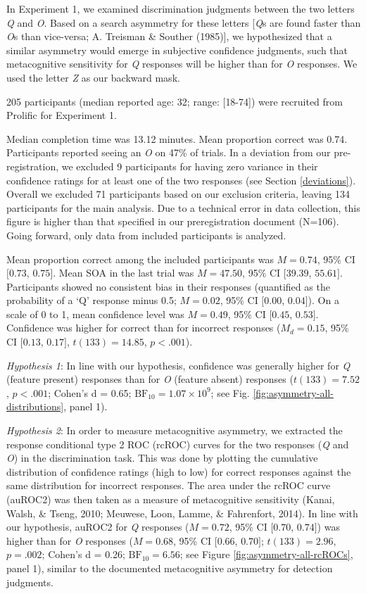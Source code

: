 \documentclass[12pt,twoside]{reedthesis}
\begin{document}
In Experiment 1, we examined discrimination judgments between the two letters \emph{Q} and \emph{O}. Based on a search asymmetry for these letters {[}\emph{Q}s are found faster than \emph{O}s than vice-versa; A. Treisman \& Souther (1985){]}, we hypothesized that a similar asymmetry would emerge in subjective confidence judgments, such that metacognitive sensitivity for \emph{Q} responses will be higher than for \emph{O} responses. We used the letter \emph{Z} as our backward mask.

205 participants (median reported age: 32; range: {[}18-74{]}) were recruited from Prolific for Experiment 1.

Median completion time was 13.12 minutes. Mean proportion correct was 0.74. Participants reported seeing an \emph{O} on 47\% of trials. In a deviation from our pre-registration, we excluded 9 participants for having zero variance in their confidence ratings for at least one of the two responses (see Section \ref{deviations}). Overall we excluded 71 participants based on our exclusion criteria, leaving 134 participants for the main analysis. Due to a technical error in data collection, this figure is higher than that specified in our preregistration document (N=106). Going forward, only data from included participants is analyzed.

Mean proportion correct among the included participants was \(M = 0.74\), 95\% CI \([0.73\), \(0.75]\). Mean SOA in the last trial was \(M = 47.50\), 95\% CI \([39.39\), \(55.61]\). Participants showed no consistent bias in their responses (quantified as the probability of a `Q' response minus 0.5; \(M = 0.02\), 95\% CI \([0.00\), \(0.04]\)). On a scale of 0 to 1, mean confidence level was \(M = 0.49\), 95\% CI \([0.45\), \(0.53]\). Confidence was higher for correct than for incorrect responses (\(M_d = 0.15\), 95\% CI \([0.13\), \(0.17]\), \(t(133) = 14.85\), \(p < .001\)).

\emph{Hypothesis 1}: In line with our hypothesis, confidence was generally higher for \emph{Q} (feature present) responses than for \emph{O} (feature absent) responses (\(t(133) = 7.52\), \(p < .001\); Cohen's d = 0.65; \(\mathrm{BF}_{\textrm{10}} = 1.07 \times 10^{9}\); see Fig. \ref{fig:asymmetry-all-distributions}, panel 1).

\emph{Hypothesis 2}: In order to measure metacognitive asymmetry, we extracted the response conditional type 2 ROC (rcROC) curves for the two responses (\emph{Q} and \emph{O}) in the discrimination task. This was done by plotting the cumulative distribution of confidence ratings (high to low) for correct responses against the same distribution for incorrect responses. The area under the rcROC curve (auROC2) was then taken as a measure of metacognitive sensitivity (Kanai, Walsh, \& Tseng, 2010; Meuwese, Loon, Lamme, \& Fahrenfort, 2014). In line with our hypothesis, auROC2 for \emph{Q} responses (\(M = 0.72\), 95\% CI \([0.70\), \(0.74]\)) was higher than for \emph{O} responses (\(M = 0.68\), 95\% CI \([0.66\), \(0.70]\); \(t(133) = 2.96\), \(p = .002\); Cohen's d = 0.26; \(\mathrm{BF}_{\textrm{10}} = 6.56\); see Figure \ref{fig:asymmetry-all-rcROCs}, panel 1), similar to the documented metacognitive asymmetry for detection judgments.
\end{document}
